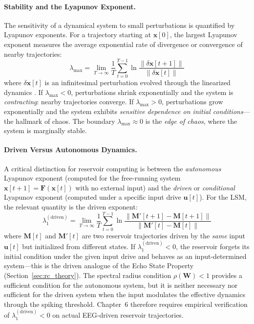\paragraph{Stability and the Lyapunov Exponent.}
The sensitivity of a dynamical system to small perturbations is quantified by Lyapunov exponents. For a trajectory starting at $\mathbf{x}[0]$, the largest Lyapunov exponent measures the average exponential rate of divergence or convergence of nearby trajectories:
\begin{equation}
    \lambda_{\max} = \lim_{T \to \infty} \frac{1}{T} \sum_{t=0}^{T-1} \ln \frac{\|\delta \mathbf{x}[t+1]\|}{\|\delta \mathbf{x}[t]\|}
    \label{eq:lyapunov}
\end{equation}
where $\delta \mathbf{x}[t]$ is an infinitesimal perturbation evolved through the linearized dynamics \cite{strogatz_nonlinear_2015}. If $\lambda_{\max} < 0$, perturbations shrink exponentially and the system is \emph{contracting}: nearby trajectories converge. If $\lambda_{\max} > 0$, perturbations grow exponentially and the system exhibits \emph{sensitive dependence on initial conditions}---the hallmark of chaos. The boundary $\lambda_{\max} \approx 0$ is the \emph{edge of chaos}, where the system is marginally stable.

\paragraph{Driven Versus Autonomous Dynamics.}
A critical distinction for reservoir computing is between the \emph{autonomous} Lyapunov exponent (computed for the free-running system $\mathbf{x}[t+1] = \mathbf{F}(\mathbf{x}[t])$ with no external input) and the \emph{driven} or \emph{conditional} Lyapunov exponent (computed under a specific input drive $\mathbf{u}[t]$). For the LSM, the relevant quantity is the driven exponent:
\begin{equation}
    \lambda_1^{(\text{driven})} = \lim_{T \to \infty} \frac{1}{T} \sum_{t=0}^{T-1} \ln \frac{\|\mathbf{M}'[t+1] - \mathbf{M}[t+1]\|}{\|\mathbf{M}'[t] - \mathbf{M}[t]\|}
    \label{eq:driven_lyapunov}
\end{equation}
where $\mathbf{M}[t]$ and $\mathbf{M}'[t]$ are two reservoir trajectories driven by the \emph{same} input $\mathbf{u}[t]$ but initialized from different states. If $\lambda_1^{(\text{driven})} < 0$, the reservoir forgets its initial condition under the given input drive and behaves as an input-determined system---this is the driven analogue of the Echo State Property (Section~\ref{sec:rc_theory}). The spectral radius condition $\rho(\mathbf{W}) < 1$ provides a sufficient condition for the autonomous system, but it is neither necessary nor sufficient for the driven system when the input modulates the effective dynamics through the spiking threshold. Chapter~6 therefore requires empirical verification of $\lambda_1^{(\text{driven})} < 0$ on actual EEG-driven reservoir trajectories.

